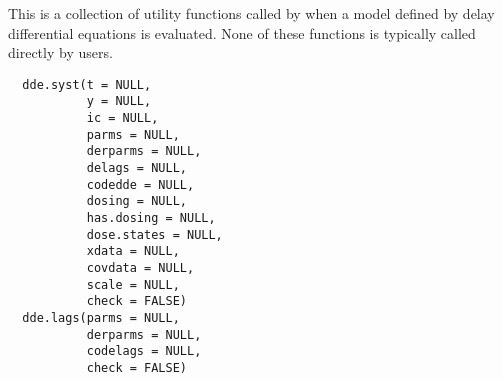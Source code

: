 %
\begin{Description}\relax
This is a collection of utility functions called by  when 
a model defined by delay differential equations is evaluated. None of these 
functions is typically called directly by users.
\end{Description}
%
\begin{Usage}
\begin{verbatim}
  dde.syst(t = NULL,
           y = NULL,
           ic = NULL,
           parms = NULL,
           derparms = NULL,
           delags = NULL,
           codedde = NULL,
           dosing = NULL,
           has.dosing = NULL,
           dose.states = NULL,
           xdata = NULL,
           covdata = NULL,
           scale = NULL,
           check = FALSE)
  dde.lags(parms = NULL,
           derparms = NULL,
           codelags = NULL,
           check = FALSE)
\end{verbatim}
\end{Usage}
%
